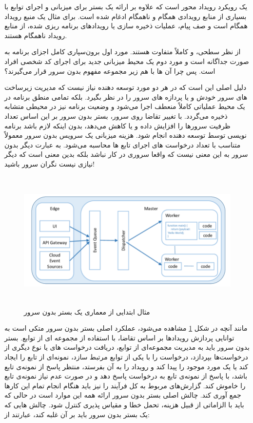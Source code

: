  یک رویکرد رویداد محور است که علاوه بر ارائه یک بستر برای میزبانی و اجرای توابع با بسیاری از منابع رویدادی همگام و ناهمگام ادغام شده است. برای مثال  یک منبع رویداد همگام است و صف پیام، عملیات ذخیره سازی یا رویدادهای برنامه ریزی شده، از منابع رویداد ناهمگام هستند.

از نظر سطحی،  و  کاملاً متفاوت هستند. مورد اول برون‌سپاری کامل اجزای برنامه به صورت جداگانه است و مورد  دوم یک محیط میزبانی جدید برای اجرای کد شخصی افراد است. پس چرا آن ها با هم زیر مجموعه مفهوم بدون سرور قرار می‌گیرند؟

دلیل اصلی این است که در هر دو مورد توسعه دهنده نیاز نیست که مدیریت زیرساخت های سرور خودش و یا پردازه های سرور را در نظر بگیرد. بلکه تمامی منطق برنامه در یک محیط عملیاتی کاملاً منعطف اجرا می‌شود و وضعیت برنامه نیز در محیطی متشابه ذخیره می‌گردد. با تغییر تقاضا روی سرور، بستر بدون سرور بر این اساس تعداد ظرفیت سرورها را افزایش داده و یا کاهش می‌دهد، بدون اینکه لازم باشد برنامه نویسی توسط توسعه دهنده انجام شود. هزینه میزبانی یک سرویس بدون سرور معمولاً متناسب با تعداد درخواست های اجرای تابع ها محاسبه می‌شود. به عبارت دیگر بدون سرور به این معنی نیست که واقعا سروری در کار نباشد بلکه بدین معنی است که دیگر نیازی نیست نگران سرور باشید!
\cite{roberts_chapin_2017}

\begin{figure}[!h]
	\centering
	\includegraphics[height=7cm]{images/Serverless-platform-architecture}
	\caption{مثال ابتدایی از معماری یک بستر بدون سرور}
	\label{ServerlessPlatformArchitecture}
\end{figure}

مانند آنچه در شکل \ref{ServerlessPlatformArchitecture} مشاهده می‌شود، عملکرد اصلی بستر بدون سرور متکی است به توانایی پردازش رویدادها بر اساس تقاضا، با استفاده از مجموعه ای از توابع. بستر بدون سرور باید به مدیریت مجموعه‌ای از توابع، دریافت درخواست های  یا نوع دیگری از درخواست‌ها بپردازد، درخواست را با یکی از توابع مرتبط سازد، نمونه‌ای از تابع را ایجاد کند یا یک مورد موجود را پیدا کند و رویداد را به آن بفرستد، منتظر پاسخ از نمونه‌ی تابع باشد، با پاسخ از نمونه‌ی تابع به درخواست  پاسخ دهد و در صورت عدم نیاز نمونه‌ی تابع را خاموش کند. گزارش‌های مربوط به کل فرآیند را نیز باید هنگام انجام تمام این کارها جمع آوری کند. چالش اصلی بستر بدون سرور ارائه همه این موارد است در حالی که باید با الزاماتی از قبیل هزینه، تحمل خطا و مقیاس پذیری کنترل شود. چالش هایی که یک بستر بدون سرور باید بر آن غلبه کند، عبارتند از:
\cite{pinto_dias_ferreira_2018}
\cite{baldini_2017}


